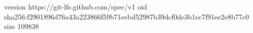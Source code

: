version https://git-lfs.github.com/spec/v1
oid sha256:f2901896d76a43a223866f59b71eebd52987b39dcf0de3b1ec7f91ee2e8b77c0
size 109838
